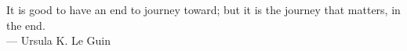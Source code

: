 \thispagestyle{empty}

\vspace*{3cm}

\begin{center}
    It is good to have an end to journey toward; but it is the journey that matters, in the end. \\ \medskip
    --- Ursula K. Le Guin
\end{center}